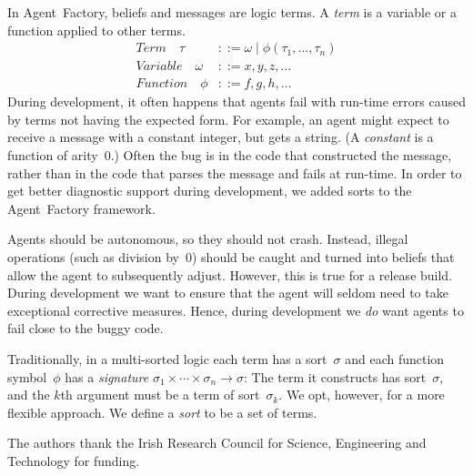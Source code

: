 \documentclass[preprint]{sigplanconf} %
\begin{document}
In Agent~Factory, beliefs and messages are logic terms. A \emph{term} is a
variable or a function applied to other terms.
\begin{align}
\mathit{Term}\quad\tau
  &::= \omega
  \mid \phi(\tau_1,\ldots,\tau_n) \\
\mathit{Variable}\quad\omega
  &::= x, y, z, \ldots \\
\mathit{Function}\quad\phi
  &::= f, g, h, \ldots
\end{align}
During development, it often happens that agents fail with run-time errors
caused by terms not having the expected form. For example, an agent might
expect to receive a message with a constant integer, but gets a string.  (A
\emph{constant} is a function of arity~$0$.) Often the bug is in the code
that constructed the message, rather than in the code that parses the
message and fails at run-time. In order to get better diagnostic support
during development, we added sorts to the Agent~Factory framework.

Agents should be autonomous, so they should not crash. Instead, illegal
operations (such as division by~$0$) should be caught and turned into
beliefs that allow the agent to subsequently adjust. However, this is true
for a release build. During development we want to ensure that the agent
will seldom need to take exceptional corrective measures. Hence, during
development we \emph{do} want agents to fail close to the buggy code.

Traditionally, in a multi-sorted logic each term has a sort~$\sigma$ and
each function symbol~$\phi$ has a \emph{signature}
$\sigma_1\times\cdots\times\sigma_n\to\sigma$: The term it constructs has
sort~$\sigma$, and the $k$th argument must be a term of sort~$\sigma_k$. We
opt, however, for a more flexible approach. We define a \emph{sort} to be a
set of terms.

\acks

The authors thank the Irish Research Council for Science, Engineering and
Technology for funding.




\end{document}
